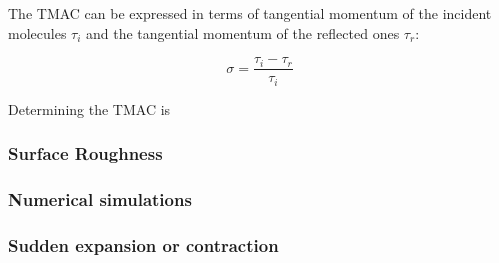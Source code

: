 The TMAC can be expressed in terms of tangential momentum of the incident molecules $\tau_i$ and the tangential momentum of the reflected ones $\tau_r$:

$$
	\sigma = \frac{\tau_i - \tau_r}{\tau_i}
$$

Determining the TMAC is

\subsubsection*{Surface Roughness}

\subsubsection*{Numerical simulations}

\subsubsection*{Sudden expansion or contraction}
